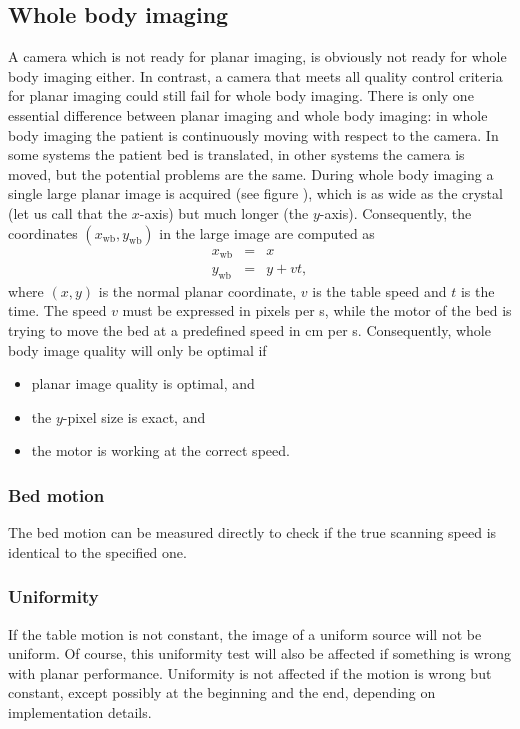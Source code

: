 \subsection{Whole body imaging}
A camera which is not ready for planar imaging, is obviously not ready
for whole body imaging either. In contrast, a camera that meets all
quality control criteria for planar imaging could still fail for whole
body imaging. There is only one essential difference between planar
imaging and whole body imaging: in whole body imaging the patient is
continuously moving with respect to the camera. In some systems the
patient bed is translated, in other systems the camera is moved, but
the potential problems are the same. During whole body imaging a
single large planar image is acquired (see figure
), which is as wide as the crystal (let us call
that the $x$-axis) but much longer (the $y$-axis). Consequently, the
coordinates $(x_{\mbox{wb}}, y_{\mbox{wb}})$ in the large image are
computed as
\begin{eqnarray}
  x_{\mbox{wb}} & = & x\\
  y_{\mbox{wb}} & = & y + v t,
\end{eqnarray}
where $(x,y)$ is the normal planar coordinate, $v$ is the table speed and $t$
is the time. The speed $v$ must be expressed in pixels per s, while the motor
of the bed is trying to move the bed at a predefined speed in cm per
s. Consequently, whole body image quality will only be optimal if
\begin{itemize}
  \item planar image quality is optimal, and
  \item the $y$-pixel size is exact, and
  \item the motor is working at the correct speed.
\end{itemize}

\subsubsection{Bed motion}
The bed motion can be measured directly to check if the true scanning
speed is identical to the specified one.

\subsubsection{Uniformity}
If the table motion is not constant, the image of a uniform source will not be
uniform. Of course, this uniformity test will also be affected if something is
wrong with planar performance. Uniformity is not affected if the motion is
wrong but constant, except possibly at the beginning and the end, depending on
implementation details.

